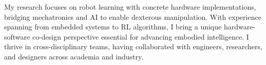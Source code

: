 
\vspace{-8mm}

\begin{cvparagraph}
My research focuses on robot learning with concrete hardware implementations, bridging mechatronics and AI to enable dexterous manipulation. With experience spanning from embedded systems to RL algorithms, I bring a unique hardware-software co-design perspective essential for advancing embodied intelligence. I thrive in cross-disciplinary teams, having collaborated with engineers, researchers, and designers across academia and industry.

\vspace{-5mm}
\end{cvparagraph}
